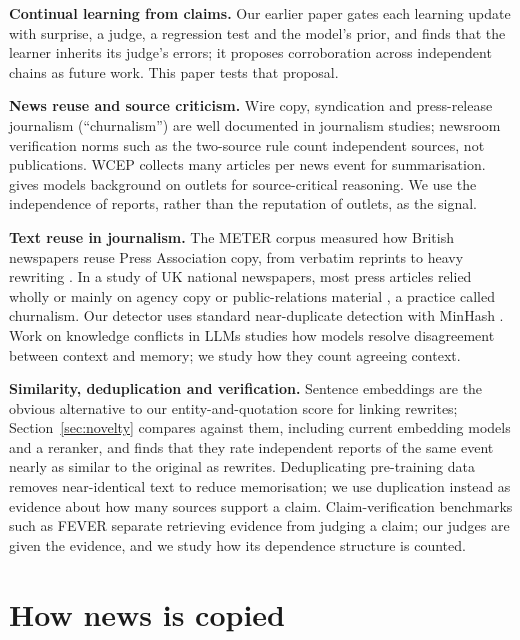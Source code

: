 \textbf{Continual learning from claims.} Our earlier paper \citep{metales2026surprise} gates each learning update with surprise, a judge, a regression test and the model's prior, and finds that the learner inherits its judge's errors; it proposes corroboration across independent chains as future work. This paper tests that proposal.

\textbf{News reuse and source criticism.} Wire copy, syndication and press-release journalism (``churnalism'') are well documented in journalism studies; newsroom verification norms such as the two-source rule count independent sources, not publications. WCEP \citep{gholipour2020wcep} collects many articles per news event for summarisation. \citet{schlichtkrull2024media} gives models background on outlets for source-critical reasoning. We use the independence of reports, rather than the reputation of outlets, as the signal.

\textbf{Text reuse in journalism.} The METER corpus measured how British newspapers reuse Press Association copy, from verbatim reprints to heavy rewriting \citep{clough2002meter}. In a study of UK national newspapers, most press articles relied wholly or mainly on agency copy or public-relations material \citep{lewis2008compromised}, a practice \citet{davies2008flat} called churnalism. Our detector uses standard near-duplicate detection with MinHash \citep{broder1997resemblance}. Work on knowledge conflicts in LLMs \citep{xu2024knowledge} studies how models resolve disagreement between context and memory; we study how they count agreeing context.

\textbf{Similarity, deduplication and verification.} Sentence embeddings \citep{reimers2019sbert} are the obvious alternative to our entity-and-quotation score for linking rewrites; Section~\ref{sec:novelty} compares against them, including current embedding models and a reranker, and finds that they rate independent reports of the same event nearly as similar to the original as rewrites. Deduplicating pre-training data \citep{lee2022dedup} removes near-identical text to reduce memorisation; we use duplication instead as evidence about how many sources support a claim. Claim-verification benchmarks such as FEVER \citep{thorne2018fever} separate retrieving evidence from judging a claim; our judges are given the evidence, and we study how its dependence structure is counted.

\section{How news is copied}\label{sec:copying}

